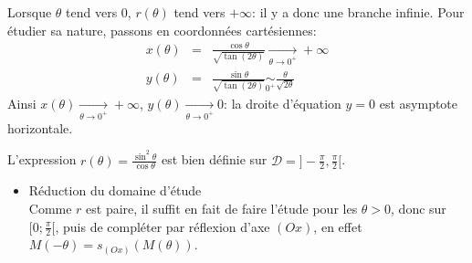 {\begin{enumerate}
{\begin{itemize}
Lorsque $\theta$ tend vers 0, $r(\theta)$ tend vers $+\infty$: il y a donc une branche infinie. Pour étudier sa nature, passons en coordonnées cartésiennes:
\begin{eqnarray*}
x(\theta)&=&\frac{\cos\theta}{\sqrt{\tan(2\theta)}}\xrightarrow[\theta\to 0^+]{}+\infty\\
y(\theta)&=&\frac{\sin\theta}{\sqrt{\tan(2\theta)}}\underset{0^+}{\sim}\frac{\theta}{\sqrt{2\theta}}
\end{eqnarray*}
Ainsi $x(\theta)\xrightarrow[\theta\to 0^+]{}+\infty$, $y(\theta)\xrightarrow[\theta\to 0^+]{}0$: la droite d'équation $y=0$ est asymptote horizontale. 
\end{itemize}

\begin{center}
\end{center}
L'expression $r(\theta)=\frac{\sin^2\theta}{\cos\theta}$ est bien définie sur $\mathcal{D}=]-\frac\pi2,\frac\pi2[$.
\begin{itemize}
\item Réduction du domaine d'étude\\
Comme $r$ est paire, il suffit en fait de faire l'étude pour les $\theta>0$, donc 
sur $[0;\frac{\pi}{2}[$, 
puis de compléter  par réflexion d'axe $(Ox)$, en effet
$M(-\theta) = s_{(Ox)}(M(\theta))$.


\end{itemize}}
\end{enumerate}}
